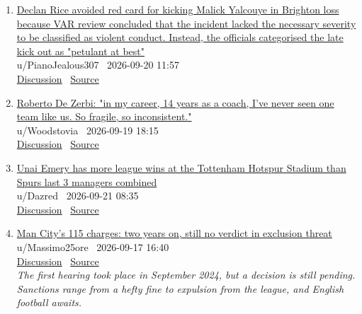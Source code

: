 \documentclass[11pt,a4paper]{article}
\begin{document}
\begin{enumerate}
  \item \href{https://www.reddit.com/r/soccer/comments/1wlf5b0/declan_rice_avoided_red_card_for_kicking_malick/}{Declan Rice avoided red card for kicking Malick Yalcouye in Brighton loss because VAR review concluded that the incident lacked the necessary severity to be classified as violent conduct. Instead, the officials categorised the late kick out as "petulant at best"}\\ {\small u/PianoJealous307 \textbullet\ 2026-09-20 11:57}\\ {\small \href{https://www.reddit.com/r/soccer/comments/1wlf5b0/declan_rice_avoided_red_card_for_kicking_malick/}{Discussion} \textbullet\ \href{https://www.goal.com/en/lists/why-declan-rice-avoided-red-card-malick-yalcouye-arsenal-brighton/blt6474f508d65d0b92}{Source}}
  \item \href{https://www.reddit.com/r/soccer/comments/1wktb2n/roberto_de_zerbi_in_my_career_14_years_as_a_coach/}{Roberto De Zerbi: "in my career, 14 years as a coach, I've never seen one team like us. So fragile, so inconsistent."}\\ {\small u/Woodstovia \textbullet\ 2026-09-19 18:15}\\ {\small \href{https://www.reddit.com/r/soccer/comments/1wktb2n/roberto_de_zerbi_in_my_career_14_years_as_a_coach/}{Discussion} \textbullet\ \href{https://talksport.com/football/4591915/roberto-de-zerbi-tottenham-most-fragile-team/}{Source}}
  \item \href{https://www.reddit.com/r/soccer/comments/1wm70lc/unai_emery_has_more_league_wins_at_the_tottenham/}{Unai Emery has more league wins at the Tottenham Hotspur Stadium than Spurs last 3 managers combined}\\ {\small u/Dazred \textbullet\ 2026-09-21 08:35}\\ {\small \href{https://www.reddit.com/r/soccer/comments/1wm70lc/unai_emery_has_more_league_wins_at_the_tottenham/}{Discussion} \textbullet\ \href{https://www.besoccer.com/new/the-emery-stat-that-exposes-tottenhams-disaster-1430954}{Source}}
  \item \href{https://www.reddit.com/r/soccer/comments/1wiz4hh/man_citys_115_charges_two_years_on_still_no/}{Man City's 115 charges: two years on, still no verdict in exclusion threat}\\ {\small u/Massimo25ore \textbullet\ 2026-09-17 16:40}\\ {\small \href{https://www.reddit.com/r/soccer/comments/1wiz4hh/man_citys_115_charges_two_years_on_still_no/}{Discussion} \textbullet\ \href{https://www.gazzetta.it/en/football/premier-league/17-09-2026/manchester-city-what-happened-to-the-115-charges-exclusion-risk-lingers.shtml}{Source}}\\ {\small\itshape The first hearing took place in September 2024, but a decision is still pending. Sanctions range from a hefty fine to expulsion from the league, and English football awaits.}

\end{enumerate}
\end{document}
